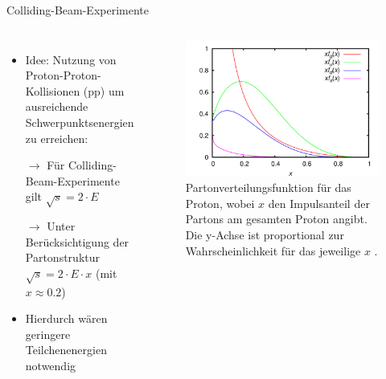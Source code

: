 \documentclass[aspectratio=1610, professionalfonts, 10pt]{beamer}
\begin{document}
\begin{frame}{Colliding-Beam-Experimente}
	\begin{columns}
				\begin{itemize}
					\setlength\itemsep{0.5em}
					\item Idee: Nutzung von Proton-Proton-Kollisionen (pp) um ausreichende Schwerpunktsenergien zu erreichen: \\
					\item[$\rightarrow$] Für Colliding-Beam-Experimente gilt $\sqrt{s} = 2 \cdot E$
					\item[$\rightarrow$] Unter Berücksichtigung der Partonstruktur $\sqrt{s} = 2 \cdot E \cdot x$ (mit $x \approx 0.2$)
					\item Hierdurch wären geringere Teilchenenergien notwendig
				\end{itemize}

			\begin{figure}
	  			\centering
				\includegraphics[width=\linewidth]{Images/pdf.png}
	  			\caption{Partonverteilungsfunktion für das Proton, wobei $x$ den Impulsanteil der Partons am gesamten Proton angibt. Die y-Achse ist proportional zur Wahrscheinlichkeit für das jeweilige $x$ \cite{wiki:pdf}.}
	  			\label{fig:sad}
			\end{figure}
	\end{columns}
\end{frame}
\end{document}
